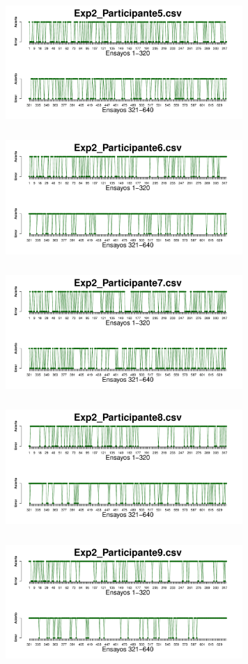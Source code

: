 \documentclass[a4paper ]{article}
\begin{document}
\begin{figure}[th]
\includegraphics[width=9cm, height=5cm]{Figures/Success_Exp2_P5} \includegraphics[width=9cm, height=5cm]{Figures/Success_Exp2_P6}
\includegraphics[width=9cm, height=5cm]{Figures/Success_Exp2_P7} \includegraphics[width=9cm, height=5cm]{Figures/Success_Exp2_P8} 
\includegraphics[width=9cm, height=5cm]{Figures/Success_Exp2_P9}
\end{figure}
\end{document}
